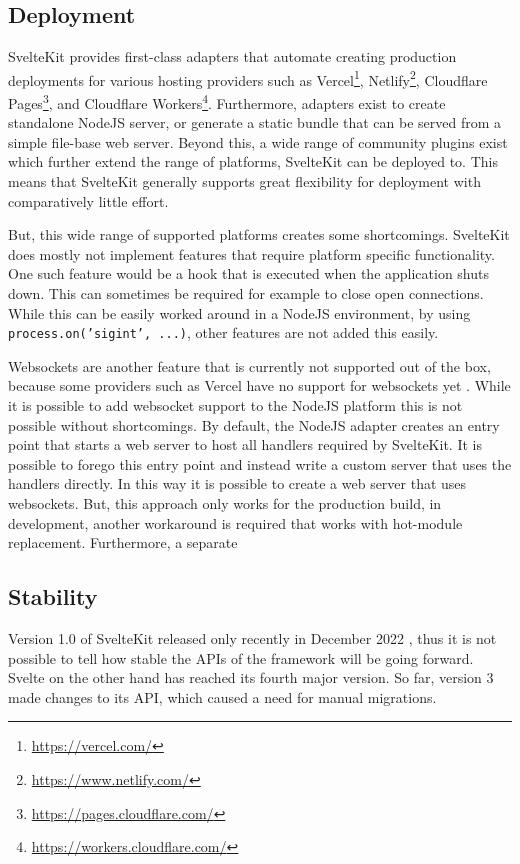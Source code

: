 \subsection{Deployment}
SvelteKit provides first-class adapters that automate creating production deployments for various hosting providers such as Vercel\footnote{\url{https://vercel.com/}}, Netlify\footnote{\url{https://www.netlify.com/}}, Cloudflare Pages\footnote{\url{https://pages.cloudflare.com/}}, and Cloudflare Workers\footnote{\url{https://workers.cloudflare.com/}}. Furthermore, adapters exist to create standalone NodeJS server, or generate a static bundle that can be served from a simple file-base web server. Beyond this, a wide range of community plugins exist which further extend the range of platforms, SvelteKit can be deployed to. This means that SvelteKit generally supports great flexibility for deployment with comparatively little effort.  

But, this wide range of supported platforms creates some shortcomings. SvelteKit does mostly not implement features that require platform specific functionality. One such feature would be a hook that is executed when the application shuts down. This can sometimes be required for example to close open connections. While this can be easily worked around in a NodeJS environment, by using \texttt{process.on('sigint', ...)}, other features are not added this easily. 

Websockets are another feature that is currently not supported out of the box, because some providers such as Vercel have no support for websockets yet \cite{noauthor_vercel_nodate}. While it is possible to add websocket support to the NodeJS platform this is not possible without shortcomings. By default, the NodeJS adapter creates an entry point that starts a web server to host all handlers required by SvelteKit. It is possible to forego this entry point and instead write a custom server that uses the handlers directly. In this way it is possible to create a web server that uses websockets. But, this approach only works for the production build, in development, another workaround is required that works with hot-module replacement. Furthermore, a separate 


\subsection{Stability}
Version 1.0 of SvelteKit released only recently in December 2022 \cite{team_announcing_2022}, thus it is not possible to tell how stable the APIs of the framework will be going forward. Svelte on the other hand has reached its fourth major version. So far, version 3 made changes to its API, which caused a need for manual migrations. 

